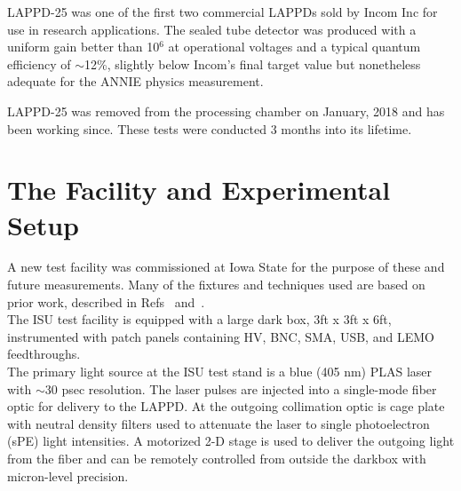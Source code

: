 \documentclass[preprint,12pt]{elsarticle}
\begin{document}
LAPPD-25 was one of the first two commercial LAPPDs sold by Incom Inc for use in research applications. The sealed tube detector was produced with a uniform gain better than 10$^6$ at operational voltages and a typical quantum efficiency of $\sim$12\%, slightly below Incom's final target value but nonetheless adequate for the ANNIE physics measurement. 

LAPPD-25 was removed from the processing chamber on January, 2018 and has been working since. These tests were conducted 3 months into its lifetime.

\section{The Facility and Experimental Setup}
\label{sec:Facility}

\noindent A new test facility was commissioned at Iowa State for the purpose of these and future measurements. Many of the fixtures and techniques used are based on prior work, described in Refs~\cite{RSI} and~\cite{8inchtiming}.\\

\noindent The ISU test facility is equipped with a large dark box, 3ft x 3ft x 6ft, instrumented with patch panels containing HV, BNC, SMA, USB, and LEMO feedthroughs.\\



\noindent The primary light source at the ISU test stand is a blue (405 nm) PLAS laser with $\sim$30 psec resolution. The laser pulses are injected into a single-mode fiber optic for delivery to the LAPPD. At the outgoing collimation optic is cage plate with neutral density filters used to attenuate the laser to single photoelectron (sPE) light intensities. A motorized 2-D stage is used to deliver the outgoing light from the fiber and can be remotely controlled from outside the darkbox with micron-level precision.\\
\end{document}
